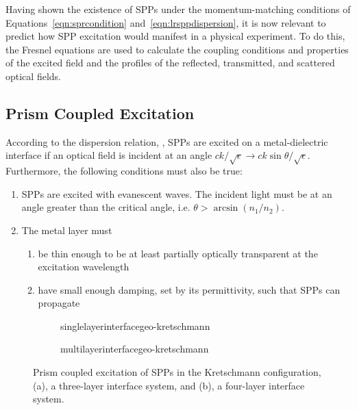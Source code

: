 Having shown the existence of SPPs under the momentum-matching conditions
of Equations~\ref{eqn:sprcondition} and~\ref{eqn:lrsppdispersion}, it is
now relevant to predict how SPP excitation would manifest in a physical
experiment.  To do this, the Fresnel equations are used to calculate the
coupling conditions and properties of the excited field and the profiles of
the reflected, transmitted, and scattered optical fields.

\subsection{Prism Coupled Excitation}
According to the dispersion relation, , SPPs are
excited on a metal-dielectric interface if an optical field is incident at
an angle $ck/\sqrt{\epsilon} \to ck\sin\theta/\sqrt{\epsilon}$.
Furthermore, the following conditions must also be true:
\begin{enumerate}
\item SPPs are excited with evanescent waves.  The
incident light must be at an angle greater than the critical angle, i.e.
$\theta>\arcsin\left(n_1/n_2\right)$.
\item The metal layer must
\begin{enumerate}
\item be thin enough to be at least partially optically transparent at the excitation wavelength
\item have small enough damping, set by its permittivity, such that SPPs can propagate
\end{enumerate}
\end{enumerate}

\begin{figure}[ht]
 \centering
 \begin{subfigure}[b]{0.4\textwidth}
  \centering
  {singlelayerinterfacegeo-kretschmann}
  \caption{}
 \end{subfigure}
 \begin{subfigure}[b]{0.4\textwidth}
  {multilayerinterfacegeo-kretschmann}
  \caption{}
 \end{subfigure}
\caption{Prism coupled excitation of SPPs in the Kretschmann configuration,
(a), a three-layer interface system, and (b), a four-layer interface system. }
\label{fig:prismcoupledsetups}
\end{figure}

